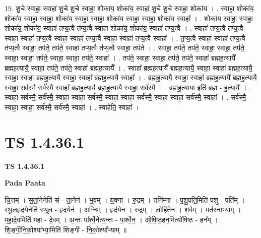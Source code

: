\documentclass[17pt]{extarticle}
\begin{document}
19. शु॒चे स्वाहा॒ स्वाहा॑ शु॒चे शु॒चे स्वाहा॒ शोका॑य॒ शोका॑य॒ स्वाहा॑ शु॒चे शु॒चे स्वाहा॒ शोका॑य । . स्वाहा॒ शोका॑य॒ शोका॑य॒ स्वाहा॒ स्वाहा॒ शोका॑य॒ स्वाहा॒ स्वाहा॒ शोका॑य॒ स्वाहा॒ स्वाहा॒ शोका॑य॒ स्वाहा᳚ । . शोका॑य॒ स्वाहा॒ स्वाहा॒ शोका॑य॒ शोका॑य॒ स्वाहा॑ तप्य॒त्वै त॑प्य॒त्वै स्वाहा॒ शोका॑य॒ शोका॑य॒ स्वाहा॑ तप्य॒त्वै । . स्वाहा॑ तप्य॒त्वै त॑प्य॒त्वै स्वाहा॒ स्वाहा॑ तप्य॒त्वै स्वाहा॒ स्वाहा॑ तप्य॒त्वै स्वाहा॒ स्वाहा॑ तप्य॒त्वै स्वाहा᳚ । . त॒प्य॒त्वै स्वाहा॒ स्वाहा॑ तप्य॒त्वै त॑प्य॒त्वै स्वाहा॒ तप॑ते॒ तप॑ते॒ स्वाहा॑ तप्य॒त्वै त॑प्य॒त्वै स्वाहा॒ तप॑ते । . स्वाहा॒ तप॑ते॒ तप॑ते॒ स्वाहा॒ स्वाहा॒ तप॑ते॒ स्वाहा॒ स्वाहा॒ तप॑ते॒ स्वाहा॒ स्वाहा॒ तप॑ते॒ स्वाहा᳚ । . तप॑ते॒ स्वाहा॒ स्वाहा॒ तप॑ते॒ तप॑ते॒ स्वाहा᳚ ब्रह्मह॒त्यायै᳚ ब्रह्मह॒त्यायै॒ स्वाहा॒ तप॑ते॒ तप॑ते॒ स्वाहा᳚ ब्रह्मह॒त्यायै᳚ । . स्वाहा᳚ ब्रह्मह॒त्यायै᳚ ब्रह्मह॒त्यायै॒ स्वाहा॒ स्वाहा᳚ ब्रह्मह॒त्यायै॒ स्वाहा॒ स्वाहा᳚ ब्रह्मह॒त्यायै॒ स्वाहा॒ स्वाहा᳚ ब्रह्मह॒त्यायै॒ स्वाहा᳚ । . ब्र॒ह्म॒ह॒त्यायै॒ स्वाहा॒ स्वाहा᳚ ब्रह्मह॒त्यायै᳚ ब्रह्मह॒त्यायै॒ स्वाहा॒ सर्व॑स्मै॒ सर्व॑स्मै॒ स्वाहा᳚ 
ब्रह्मह॒त्यायै᳚ ब्रह्मह॒त्यायै॒ स्वाहा॒ सर्व॑स्मै । . ब्र॒ह्म॒ह॒त्याया॒ इति॑ ब्रह्म - ह॒त्यायै᳚ । . स्वाहा॒ सर्व॑स्मै॒ सर्व॑स्मै॒ स्वाहा॒ स्वाहा॒ सर्व॑स्मै॒ स्वाहा॒ स्वाहा॒ सर्व॑स्मै॒ स्वाहा॒ स्वाहा॒ सर्व॑स्मै॒ स्वाहा᳚ । . सर्व॑स्मै॒ स्वाहा॒ स्वाहा॒ सर्व॑स्मै॒ सर्व॑स्मै॒ स्वाहा᳚ । . स्वाहेति॒ स्वाहा᳚ । \newline
\pagebreak
{}
\section*{ TS 1.4.36.1 }

\textbf{TS 1.4.36.1 } \newline

\textbf{Pada Paata} \newline

चि॒त्तम् । स॒तां॒नेनेति॑ सं - ता॒नेन॑ । भ॒वम् । य॒क्ना । रु॒द्रम् । तनि॑म्ना । प॒शु॒पति॒मिति॑ पशु - पति᳚म् । स्थू॒ल॒हृ॒द॒येनेति॑ स्थूल - हृ॒द॒येन॑ । अ॒ग्निम् । हृद॑येन । रु॒द्रम् । लोहि॑तेन । श॒र्वम् । मत॑स्नाभ्याम् । म॒हा॒दे॒वमिति॑ महा - दे॒वम् । अ॒न्तः पा᳚र्श्वे॒नेत्य॒न्तः - पा॒र्श्वे॒न॒ । ओ॒षि॒ष्ठ॒हन॒मित्यो॑षिष्ठ - हन᳚म् । शि॒ङ्गी॒नि॒को॒श्या᳚भ्या॒मिति॑ शिङ्गी - नि॒को॒श्या᳚भ्याम् ॥  \newline
\end{document}
